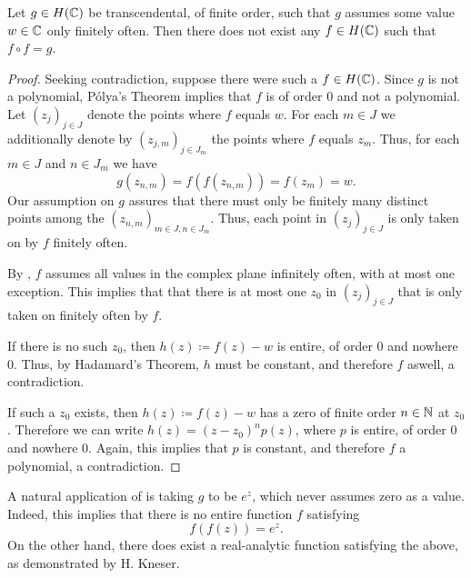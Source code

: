 \begin{theorem}[Thron] \label{thm:thron}
    Let $g \in H(\mathbb{C})$ be transcendental, of finite order, such that $g$ assumes some value $w \in \mathbb{C}$ only finitely often. Then there does not exist any $f \in H(\mathbb{C})$ such that $f \circ f = g$.
\end{theorem}

\begin{proof}
    Seeking contradiction, suppose there were such a $f \in H(\mathbb{C})$. Since $g$ is not a polynomial, Pólya's Theorem implies that $f$ is of order $0$ and not a polynomial. Let $(z_j)_{j \in J}$ denote the points where $f$ equals $w$. For each $m \in J$ we additionally denote by $(z_{j,m})_{j \in J_m}$ the points where $f$ equals $z_m$. Thus, for each $m \in J$ and $n \in J_m$ we have
    $$ g(z_{n,m}) = f(f(z_{n,m})) = f(z_m) = w. $$
    Our assumption on $g$ assures that there must only be finitely many distinct points among the $(z_{n,m})_{m \in J,n \in J_m}$. Thus, each point in $(z_j)_{j \in J}$ is only taken on by $f$ finitely often.

    By , $f$ assumes all values in the complex plane infinitely often, with at most one exception. This implies that that there is at most one $z_0$ in $(z_j)_{j \in J}$ that is only taken on finitely often by $f$.

    If there is no such $z_0$, then $h(z) \coloneqq f(z) - w$ is entire, of order $0$ and nowhere $0$. Thus, by Hadamard's Theorem, $h$ must be constant, and therefore $f$ aswell, a contradiction.

    If such a $z_0$ exists, then $h(z) \coloneqq f(z) - w$ has a zero of finite order $n \in \mathbb{N}$ at $z_0$. Therefore we can write $h(z) = (z - z_0)^n p(z)$, where $p$ is entire, of order $0$ and nowhere $0$. Again, this implies that $p$ is constant, and therefore $f$ a polynomial, a contradiction.
\end{proof}

\begin{example}
    A natural application of  is taking $g$ to be $e^z$, which never assumes zero as a value. Indeed, this implies that there is no entire function $f$ satisfying
    $$ f(f(z)) = e^z. $$
    On the other hand, there does exist a real-analytic function satisfying the above, as demonstrated by H. Kneser. 
\end{example}